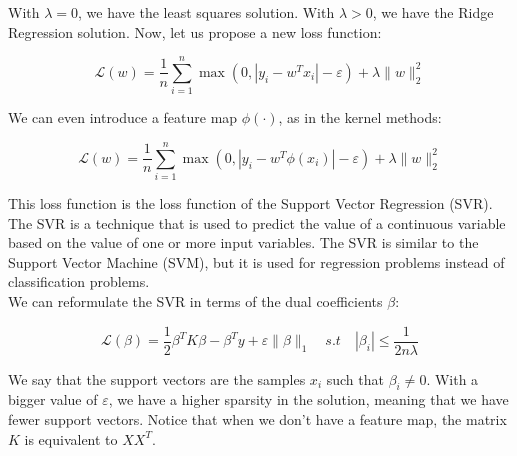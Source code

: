 With $\lambda = 0$, we have the least squares solution. With $\lambda > 0$, we have the Ridge Regression solution.
Now, let us propose a new loss function:

\begin{equation}
    \mathcal{L}(w) = \frac{1}{n} \sum_{i=1}^n \max(0, |y_i - w^T x_i| - \varepsilon) + \lambda \|w\|_2^2
\end{equation}

We can even introduce a feature map $\phi(\cdot)$, as in the kernel methods:

\begin{equation}
    \mathcal{L}(w) = \frac{1}{n} \sum_{i=1}^n \max(0, |y_i - w^T \phi(x_i)| - \varepsilon) + \lambda \|w\|_2^2
\end{equation}

This loss function is the loss function of the Support Vector Regression (SVR). The SVR is a 
technique that is used to predict the value of a continuous variable based on the value of one 
or more input variables. The SVR is similar to the Support Vector Machine (SVM), but it is used for 
regression problems instead of classification problems.\\

We can reformulate the SVR in terms of the dual coefficients $\beta$:

\begin{equation}
    \mathcal{L}(\beta) = \frac{1}{2} \beta^T K \beta - \beta^T y + \varepsilon \| \beta \|_1
    \quad s.t \quad |\beta_i| \leq \frac{1}{2 n \lambda}
\end{equation}

We say that the support vectors are the samples $x_i$ such that $\beta_i \neq 0$. With a bigger
value of $\varepsilon$, we have a higher sparsity in the solution, meaning that we have fewer support
vectors. Notice that when we don't have a feature map, the matrix $K$ is equivalent to
$X X^T$.\\

